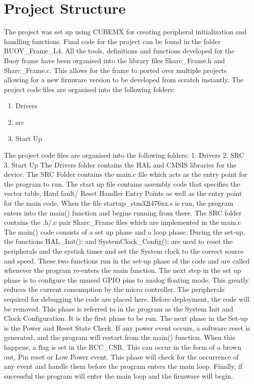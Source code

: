 \section{Project Structure}

The project was set up using CUBEMX for creating peripheral initialization and handling functions. Final code for the project can be found in the folder BUOY\_Frame\_L4. All the tools, definitions and functions developed for the Buoy frame have been organised into the library files Sharc\_Frame.h and Sharc\_Frame.c. This allows for the frame to ported over multiple projects allowing for a new firmware version to be developed from scratch instantly.
The project code files are organised into the following folders:

\begin{enumerate}
	\item Drivers
	\item src
	\item Start Up
\end{enumerate}
The project code files are organised into the following folders:
1.	Drivers 
2.	SRC
3.	Start Up
The Drivers folder contains the HAL and CMSIS libraries for the device.  The SRC Folder contains the main.c file which acts as the entry point for the program to run. The start up file contains assembly code that specifies the vector table, Hard fault/ Reset Handler Entry Points as well as the entry point for the main code. When the file startup\_stm32l476xx.s is run, the program enters into the main() function and begins running from there. The SRC folder contains the .h/.c pair Sharc\_Frame files which are implemented in the main.c 
The main() code consists of a set up phase and a loop phase. During the set-up, the functions HAL\_Init(); and SystemClock\_Config(); are used to reset the peripherals and the systick timer and set the System clock to the correct source and speed. These two functions run in the set-up phase of the code and are called whenever the program re-enters the main function. The next step in the set up phase is to configure the unused GPIO pins to analog floating mode. This greatly reduces the current consumption by the micro controller. The peripherals required for debugging the code are placed here. Before deployment, the code will be removed. This phase is referred to in the program as the System Init and Clock Configuration. It is the first phase to be run.
The next phase in the Set-up is the Power and Reset State Check. If any power event occurs, a software reset is generated, and the program will restart from the main() function. When this happens, a flag is set in the RCC\_CSR. This can occur in the form of a brown out, Pin reset or Low Power event. This phase will check for the occurrence of any event and handle them before the program enters the main loop. Finally, if successful the program will enter the main loop and the firmware will begin.  

